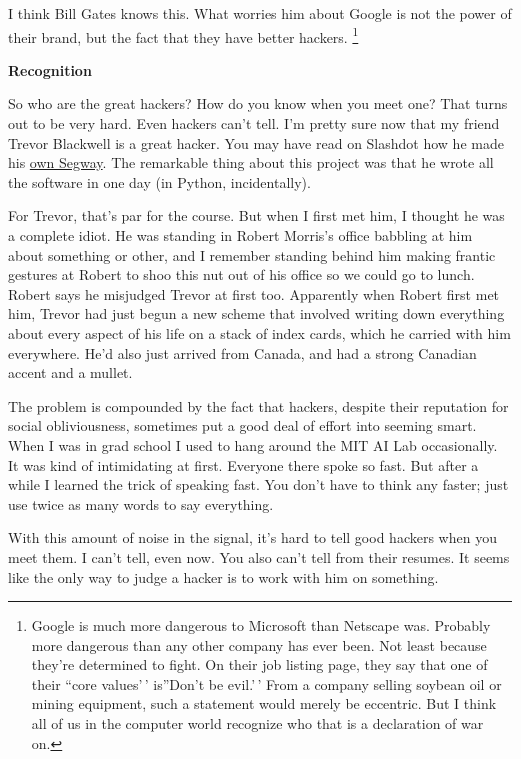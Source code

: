 \documentclass[12pt]{book}
\begin{document}
I think Bill Gates knows this. What worries him about Google is not the
power of their brand, but the fact that they have better hackers.
\footnote{Google is much more dangerous to Microsoft than Netscape was.
Probably more dangerous than any other company has ever been. Not least
because they're determined to fight. On their job listing page, they say
that one of their ``core values'\,' is''Don't be evil.'\,' From a
company selling soybean oil or mining equipment, such a statement would
merely be eccentric. But I think all of us in the computer world
recognize who that is a declaration of war on.}

\textbf{Recognition}

So who are the great hackers? How do you know when you meet one? That
turns out to be very hard. Even hackers can't tell. I'm pretty sure now
that my friend Trevor Blackwell is a great hacker. You may have read on
Slashdot how he made his \href{http://www.tlb.org/scooter.html}{own
Segway}. The remarkable thing about this project was that he wrote all
the software in one day (in Python, incidentally).

For Trevor, that's par for the course. But when I first met him, I
thought he was a complete idiot. He was standing in Robert Morris's
office babbling at him about something or other, and I remember standing
behind him making frantic gestures at Robert to shoo this nut out of his
office so we could go to lunch. Robert says he misjudged Trevor at first
too. Apparently when Robert first met him, Trevor had just begun a new
scheme that involved writing down everything about every aspect of his
life on a stack of index cards, which he carried with him everywhere.
He'd also just arrived from Canada, and had a strong Canadian accent and
a mullet.

The problem is compounded by the fact that hackers, despite their
reputation for social obliviousness, sometimes put a good deal of effort
into seeming smart. When I was in grad school I used to hang around the
MIT AI Lab occasionally. It was kind of intimidating at first. Everyone
there spoke so fast. But after a while I learned the trick of speaking
fast. You don't have to think any faster; just use twice as many words
to say everything.

With this amount of noise in the signal, it's hard to tell good hackers
when you meet them. I can't tell, even now. You also can't tell from
their resumes. It seems like the only way to judge a hacker is to work
with him on something.
\end{document}
